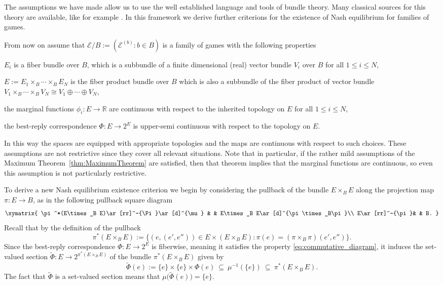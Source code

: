 \documentclass[a4paper,11pt,reqno,english]{amsart}
\theoremstyle{plain}
\theoremstyle{definition}
\newcommand{\Ecal}{\mathcal{E}}
\begin{document}
\medskip
The assumptions we have made allow us to use the well established language and tools of bundle theory.
Many classical sources for this theory are available, like for example \cite{Atiyah1967, Husemoller1994}.
In this framework we derive further criterions for the existence of Nash equilibrium for families of games.

\medskip
From now on assume that $\Ecal/B:=(\Ecal^{(b)}:b\in B)$ is a family of games with the following properties
\begin{compactitem}[\quad --]
	\item $E_i$ is a fiber bundle over $B$, which is a subbundle of a finite dimensional (real) vector bundle $V_i$ over $B$ for all $1\leq i\leq N$,
	\item $E:=E_1\times_B\cdots \times_BE_N$ is the fiber product bundle over $B$ which is also a subbundle of the fiber product of vector bundle $V_1\times_B\cdots\times_B V_N\cong V_1\oplus\cdots\oplus V_N$,
	\item the marginal functions $\phi_i \colon E \longrightarrow \mathbb{R}$ are continuous with respect to the inherited topology on $E$ for all $1\leq i\leq N$,
	\item the best-reply correspondence $\Phi \colon E \longrightarrow 2^{E}$ is upper-semi continuous with respect to the topology on $E$.
\end{compactitem}
In this way the spaces are equipped with appropriate topologies and the maps are continuous with respect to such choices.
These assumptions are not restrictive since they cover all relevant situations. Note that in particular, if the rather mild assumptions of the Maximum Theorem~\ref{thm:MaximumTheorem} are satisfied, then that theorem implies that the marginal functions are continuous, so even this assumption is not particularly restrictive.

\medskip
To derive a new Nash equilibrium existence criterion we begin by considering the pullback of the bundle $E\times_B E$ along the projection map $\pi\colon E\longrightarrow B$, as in the following pullback square diagram
\begin{equation}\label{eq:pull-back}
	\xymatrix{
	\pi^*(E\times_B E)\ar[rr]^-{\Pi}\ar[d]^{\mu} & & E\times_B E\ar[d]^{\pi\times_B\pi}\\
	E\ar[rr]^-{\pi}& & B.
	}
\end{equation}
Recall that by the definition of the pullback
\begin{displaymath}
	\pi^*(E\times_B E) := \{(e, (e', e'')) \in E\times (E \times_B E): \pi(e) = (\pi \times_B \pi)(e',e'') \}.
\end{displaymath}
Since the best-reply correspondence $\Phi \colon E \longrightarrow 2^{E}$ is fiberwise, meaning it satisfies the property \eqref{eq:commutative_diagram}, it induces the set-valued section $\widetilde{\Phi}\colon E\longrightarrow 2^{\pi^*(E\times_B E)}$ of the bundle $\pi^*(E\times_B E)$ given by
\begin{displaymath}
	\widetilde{\Phi} (e):= \{e\}\times\{e\}\times  \Phi(e) \ \subseteq \ \mu^{-1}(\{e\})  \ \subseteq \ \pi^*(E\times_B E).
\end{displaymath}
The fact that $\widetilde{\Phi}$ is a set-valued section means that $\mu\big(\widetilde{\Phi} (e)\big)=\{e\}$.
\end{document}
